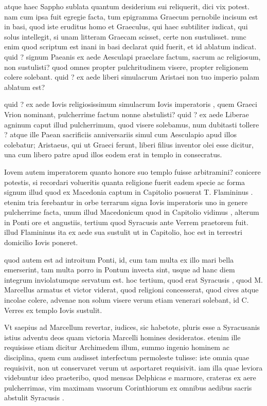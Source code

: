  atque haec Sappho sublata quantum desiderium sui reliquerit, dici vix potest. nam cum ipsa fuit egregie facta, tum epigramma Graecum pernobile incisum est in basi, quod iste eruditus homo et Graeculus, qui haec subtiliter iudicat, qui solus intellegit, si unam litteram Graecam scisset, certe non sustulisset. nunc enim quod scriptum est inani in basi declarat quid fuerit, et id ablatum indicat. quid ? signum Paeanis ex aede Aesculapi praeclare factum, sacrum ac religiosum, non sustulisti? quod omnes propter pulchritudinem visere, propter religionem colere solebant. quid ? ex aede liberi simulacrum Aristaei non tuo imperio palam ablatum est?

 quid ? ex aede Iovis religiosissimum simulacrum Iovis imperatoris , quem Graeci Vrion nominant, pulcherrime factum nonne abstulisti? quid ? ex aede Liberae agninum caput illud pulcherrimum, quod visere solebamus, num dubitasti tollere ? atque ille Paean sacrificiis anniversariis simul cum Aesculapio apud illos colebatur; Aristaeus, qui ut Graeci ferunt, liberi filius inventor olei esse dicitur, una cum libero patre apud illos eodem erat in templo in consecratus.

 Iovem autem imperatorem quanto honore suo templo fuisse arbitramini? conicere potestis, si recordari volueritis quanta religione fuerit eadem specie ac forma signum illud quod ex Macedonia captum in Capitolio posuerat T. Flamininus . etenim tria ferebantur in orbe terrarum signa Iovis imperatoris uno in genere pulcherrime facta, unum illud Macedonicum quod in Capitolio vidimus , alterum in Ponti ore et angustiis, tertium quod Syracusis ante Verrem praetorem fuit. illud Flamininus ita ex aede sua sustulit ut in Capitolio, hoc est in terrestri domicilio Iovis poneret.

 quod autem est ad introitum Ponti, id, cum tam multa ex illo mari bella emerserint, tam multa porro in Pontum invecta sint, usque ad hanc diem integrum inviolatumque servatum est. hoc tertium, quod erat Syracusis , quod M. Marcellus armatus et victor viderat, quod religioni concesserat, quod cives atque incolae colere, advenae non solum visere verum etiam venerari solebant, id C. Verres ex templo Iovis sustulit.

 Vt saepius ad Marcellum revertar, iudices, sic habetote, pluris esse a Syracusanis istius adventu deos quam victoria Marcelli homines desideratos. etenim ille requisisse etiam dicitur Archimedem illum, summo ingenio hominem ac disciplina, quem cum audisset interfectum permoleste tulisse: iste omnia quae requisivit, non ut conservaret verum ut asportaret requisivit. iam illa quae leviora videbuntur ideo praeteribo, quod mensas Delphicas e marmore, crateras ex aere pulcherrimas, vim maximam vasorum Corinthiorum ex omnibus aedibus sacris abstulit Syracusis .

